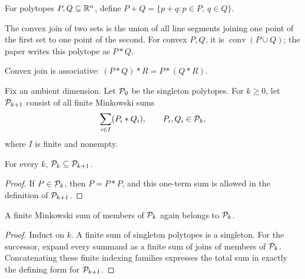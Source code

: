 \begin{definition}
  \label{def:minkowski-sum}
  For polytopes $P,Q\subseteq\mathbb{R}^n$, define
  $P+Q=\{p+q:p\in P,\ q\in Q\}$.
\end{definition}

\begin{definition}
  \label{def:convex-join}
  \mathlibok
  The convex join of two sets is the union of all line segments joining one
  point of the first set to one point of the second.  For convex $P,Q$, it is
  $\operatorname{conv}(P\cup Q)$; the paper writes this polytope as $P*Q$.
\end{definition}

\begin{lemma}
  \label{lem:convex-join-assoc}
  \mathlibok
  Convex join is associative: $(P*Q)*R=P*(Q*R)$.
\end{lemma}

\begin{definition}
  \label{def:polytope-classes}
  Fix an ambient dimension.  Let $\mathcal{P}_0$ be the singleton polytopes.  For
  $k\geq0$, let $\mathcal{P}_{k+1}$ consist of all finite Minkowski sums
  \[
    \sum_{i\in I}(P_i*Q_i),\qquad P_i,Q_i\in\mathcal{P}_k,
  \]
  where $I$ is finite and nonempty.
\end{definition}

\begin{lemma}
  \label{lem:polytope-class-monotone}
  For every $k$, $\mathcal{P}_k\subseteq\mathcal{P}_{k+1}$.
\end{lemma}
\begin{proof}
  If $P\in\mathcal{P}_k$, then $P=P*P$, and this one-term sum is allowed in the
  definition of $\mathcal{P}_{k+1}$.
\end{proof}

\begin{lemma}
  \label{lem:polytope-class-sum-closed}
  A finite Minkowski sum of members of $\mathcal{P}_k$ again belongs to
  $\mathcal{P}_k$.
\end{lemma}
\begin{proof}
  Induct on $k$.  A finite sum of singleton polytopes is a singleton.  For the
  successor, expand every summand as a finite sum of joins of members of
  $\mathcal{P}_k$.  Concatenating these finite indexing families expresses the
  total sum in exactly the defining form for $\mathcal{P}_{k+1}$.
\end{proof}

